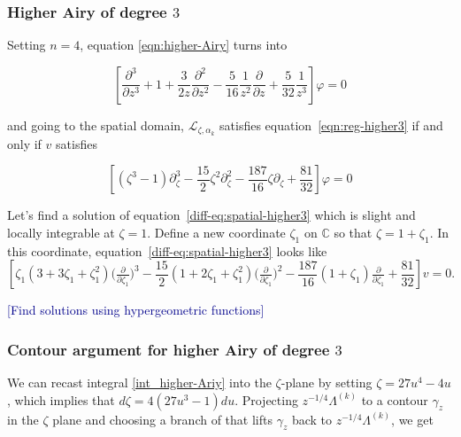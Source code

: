 \documentclass{article}
\theoremstyle{definition}
\newcommand{\C}{\mathbb{C}}
\newcommand{\laplace}{\mathcal{L}}
\begin{document}
\subsubsection{Higher Airy of degree $3$}
Setting $n=4$, equation \ref{eqn:higher-Airy} turns into 

\begin{equation}\label{eqn:reg-higher3}
\left[\frac{\partial^3}{\partial z^3}+1+\frac{3}{2z}\frac{\partial^2}{\partial z^2}-\frac{5}{16}\frac{1}{z^2}\frac{\partial}{\partial z}+\frac{5}{32}\frac{1}{z^3}\right]\varphi=0
\end{equation}

and going to the spatial domain, $\laplace_{\zeta,\alpha_k}$ satisfies equation~\eqref{eqn:reg-higher3} if and only if $v$ satisfies 


\begin{equation}\label{diff-eq:spatial-higher3}
\left[(\zeta^3-1)\partial_\zeta^3-\frac{15}{2}\zeta^2\partial_\zeta^2-\frac{187}{16}\zeta\partial_\zeta+\frac{81}{32}\right]\varphi=0
\end{equation}

Let's find a solution of equation~\eqref{diff-eq:spatial-higher3} which is slight and locally integrable at $\zeta = 1$. Define a new coordinate $\zeta_1$ on $\C$ so that $\zeta = 1 + \zeta_1$. In this coordinate, equation~\eqref{diff-eq:spatial-higher3} looks like
\begin{equation}%
\left[\zeta_1(3 + 3\zeta_1 + \zeta_1^2) \big(\tfrac{\partial}{\partial \zeta_1}\big)^3 - \frac{15}{2}(1 + 2\zeta_1 + \zeta_1^2) \big(\tfrac{\partial}{\partial \zeta_1}\big)^2 -\frac{187}{16}(1+\zeta_1)\tfrac{\partial}{\partial \zeta_1} + \frac{81}{32}\right] v = 0.
\end{equation}

\textcolor{DarkBlue}{[Find solutions using hypergeometric functions]}

\subsubsection{Contour argument for higher Airy of degree $3$}

We can recast integral \eqref{int_higher-Ariy} into the $\zeta$-plane by setting $\zeta=27 u^4-4 u$, which implies that $d\zeta=4 (27 u^3-1) du$. Projecting $z^{-1/4}\Lambda^{(k)}$ to a contour $\gamma_z$ in the $\zeta$ plane and choosing a branch of that lifts $\gamma_z$ back to $z^{-1/4}\Lambda^{(k)}$, we get 
\end{document}
